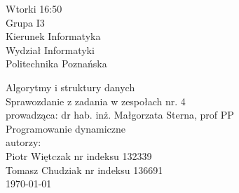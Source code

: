 \documentclass[polish,polish,a4paper]{article}
\begin{document}
	
		\begin{titlepage}
			\begin{flushright}
				{ Wtorki 16:50\\
					Grupa I3\\
					Kierunek Informatyka\\
					Wydział Informatyki\\
					Politechnika Poznańska}
			\end{flushright}
		\vspace*{\fill}
		\begin{center}
			{\Large Algorytmy i struktury danych \\[0.1cm]
				Sprawozdanie z zadania w zespołach nr. 4\\[0.1cm]
				prowadząca: dr hab. inż. Małgorzata Sterna, prof PP}\\
			{\Huge Programowanie dynamiczne\\ [0.4cm]}
			{\large autorzy:\\[0.1cm]}
			{\large Piotr Więtczak nr indeksu 132339\\[0.1cm] Tomasz Chudziak nr indeksu 136691}\\[0.5cm]
			\today
		\end{center}
		\vspace*{\fill}
	\end{titlepage}
\end{document}
